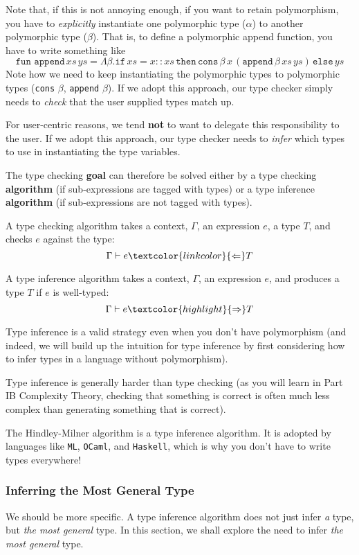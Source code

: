 {Note that, if this is not annoying enough, if you want to retain polymorphism, you have to \textit{explicitly} instantiate one polymorphic type ($\alpha$) to another polymorphic type ($\beta$). That is, to define a polymorphic append function, you have to write something like
\[\texttt{fun append} \, xs \, ys = \Lambda \beta . \texttt{if} \, xs = x::xs \, \texttt{then} \, \texttt{cons} \, \beta  \, x  \, (\texttt{append}  \, \beta  \, xs  \, ys) \, \texttt{else} \, ys   \]
Note how we need to keep instantiating the polymorphic types to polymorphic types (\texttt{cons} $\beta$, \texttt{append} $\beta$). If we adopt this approach, our type checker simply needs to \textit{check} that the user supplied types match up.

For user-centric reasons, we tend \textbf{not} to want to delegate this responsibility to the user. If we adopt this approach, our type checker needs to \textit{infer} which types to use in instantiating the type variables.

The type checking \textbf{goal} can therefore be solved either by a type checking \textbf{algorithm} (if sub-expressions are tagged with types) or a type inference \textbf{algorithm} (if sub-expressions are not tagged with types).

A type checking algorithm takes a context, $\Gamma$, an expression $e$, a type $T$, and checks $e$ against the type:
\[\Gamma \vdash e \textcolor{linkcolor}{\Leftarrow} T\]

A type inference algorithm takes a context, $\Gamma$, an expression $e$, and produces a type $T$ if $e$ is well-typed:
\[\Gamma \vdash e \textcolor{highlight}{\Rightarrow} T\]

Type inference is a valid strategy even when you don't have polymorphism (and indeed, we will build up the intuition for type inference by first considering how to infer types in a language without polymorphism).

Type inference is generally harder than type checking (as you will learn in \textsf{Part IB Complexity Theory}, checking that something is correct is often much less complex than generating something that is correct).

The Hindley-Milner algorithm is a type inference algorithm. It is adopted by languages like \texttt{ML}, \texttt{OCaml}, and \texttt{Haskell}, which is why you don't have to write types everywhere!

\subsubsection{Inferring the Most General Type}
We should be more specific. A type inference algorithm does not just infer \textit{a} type, but \textit{the most general} type. In this section, we shall explore the need to infer \textit{the most general} type.

}
